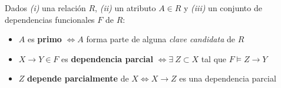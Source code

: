\documentclass[preview]{standalone}
\begin{document}
Dados {\em (i)} una relaci\'on $R$, {\em (ii)} un atributo $A\in R$ y {\em (iii)} un conjunto de dependencias funcionales $F$ de $R$: 


\begin{itemize}
\item $A$ es \textbf{primo} $\Leftrightarrow A$ forma parte de alguna {\em clave candidata} de $R$
\item $X \rightarrow Y\in F$ es \textbf{dependencia parcial} $\Leftrightarrow \exists \ Z \subset X$ tal que $F \models Z\rightarrow Y$
\item $Z$ \textbf{depende parcialmente} de $X \Leftrightarrow X \rightarrow Z$ es una dependencia parcial
\end{itemize}
\end{document}
